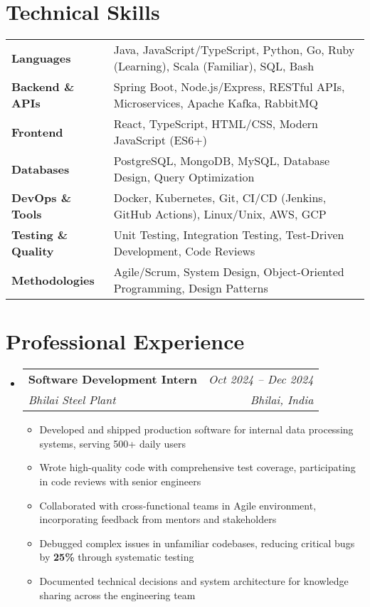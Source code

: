 \documentclass[letterpaper,10pt]{article}
\makeatletter
\newcommand{\resumeItem}[1]{
  \item\small{#1 \vspace{-2pt}}
}
\newcommand{\resumeSubheading}[4]{
  \vspace{-1pt}\item[]
    \begin{tabular*}{\textwidth}[t]{l@{\extracolsep{\fill}}r}
      \textbf{\color{accentcolor}#1} & {\small\textit{#2}} \\
      {\small\textit{#3}} & {\small\textit{#4}} \\
    \end{tabular*}\vspace{-7pt}
}
\newcommand{\resumeSubHeadingListStart}{\begin{itemize}[leftmargin=0in, label={}]}
\newcommand{\resumeSubHeadingListEnd}{\end{itemize}\vspace{-5pt}}
\newcommand{\resumeItemListStart}{\begin{itemize}[leftmargin=0.2in, rightmargin=0in]}
\newcommand{\resumeItemListEnd}{\end{itemize}\vspace{-2pt}}
\makeatother
\begin{document}
\section{Technical Skills}
\vspace{2pt}
\begin{tabularx}{\textwidth}{@{}l X@{}}
\textbf{Languages} & Java, JavaScript/TypeScript, Python, Go, Ruby (Learning), Scala (Familiar), SQL, Bash \\
\textbf{Backend \& APIs} & Spring Boot, Node.js/Express, RESTful APIs, Microservices, Apache Kafka, RabbitMQ \\
\textbf{Frontend} & React, TypeScript, HTML/CSS, Modern JavaScript (ES6+) \\
\textbf{Databases} & PostgreSQL, MongoDB, MySQL, Database Design, Query Optimization \\
\textbf{DevOps \& Tools} & Docker, Kubernetes, Git, CI/CD (Jenkins, GitHub Actions), Linux/Unix, AWS, GCP \\
\textbf{Testing \& Quality} & Unit Testing, Integration Testing, Test-Driven Development, Code Reviews \\
\textbf{Methodologies} & Agile/Scrum, System Design, Object-Oriented Programming, Design Patterns \\
\end{tabularx}

\section{Professional Experience}
\resumeSubHeadingListStart

\resumeSubheading
  {Software Development Intern}{Oct 2024 -- Dec 2024}
  {Bhilai Steel Plant}{Bhilai, India}
  \resumeItemListStart
    \resumeItem{Developed and shipped production software for internal data processing systems, serving 500+ daily users}
    \resumeItem{Wrote high-quality code with comprehensive test coverage, participating in code reviews with senior engineers}
    \resumeItem{Collaborated with cross-functional teams in Agile environment, incorporating feedback from mentors and stakeholders}
    \resumeItem{Debugged complex issues in unfamiliar codebases, reducing critical bugs by \textbf{25\%} through systematic testing}
    \resumeItem{Documented technical decisions and system architecture for knowledge sharing across the engineering team}
  \resumeItemListEnd

\resumeSubHeadingListEnd

\end{document}

